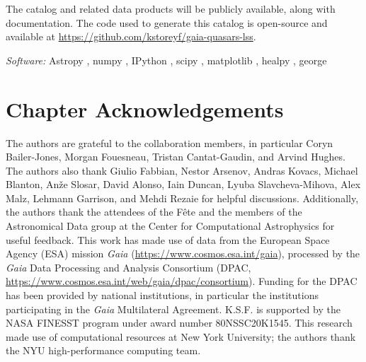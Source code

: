 The catalog and related data products will be publicly available, along with documentation.
The code used to generate this catalog is open-source and available at \url{https://github.com/kstoreyf/gaia-quasars-lss}.

\textit{Software:} Astropy \citep{the_astropy_collaboration_astropy_2013, the_astropy_collaboration_astropy_2018, the_astropy_collaboration_astropy_2022}, numpy \citep{VanDerWalt2011}, IPython \citep{Perez2007}, scipy \citep{Virtanen2020}, matplotlib \citep{Hunter2007}, healpy \citep{gorski_healpix_2005, zonca_healpy_2019}, george \citep{Ambikasaran2016}

\section{Chapter Acknowledgements}

The authors are grateful to the \Gaia collaboration members, in particular Coryn Bailer-Jones, Morgan Fouesneau, Tristan Cantat-Gaudin, and Arvind Hughes.
The authors also thank Giulio Fabbian, Nestor Arsenov, Andras Kovacs, Michael Blanton, An\v{z}e Slosar, David Alonso, Iain Duncan, Lyuba Slavcheva-Mihova, Alex Malz, Lehmann Garrison, and Mehdi Rezaie for helpful discussions.
Additionally, the authors thank the attendees of the \Gaia F\^{e}te and the members of the Astronomical Data group at the Center for Computational Astrophysics for useful feedback.
This work has made use of data from the European Space Agency (ESA) mission {\it Gaia} (\url{https://www.cosmos.esa.int/gaia}), processed by the {\it Gaia} Data Processing and Analysis Consortium (DPAC, \url{https://www.cosmos.esa.int/web/gaia/dpac/consortium}). 
Funding for the DPAC has been provided by national institutions, in particular the institutions participating in the {\it Gaia} Multilateral Agreement.
K.S.F. is supported by the NASA FINESST program under award number 80NSSC20K1545.
This research made use of computational resources at New York University; the authors thank the NYU high-performance computing team.

